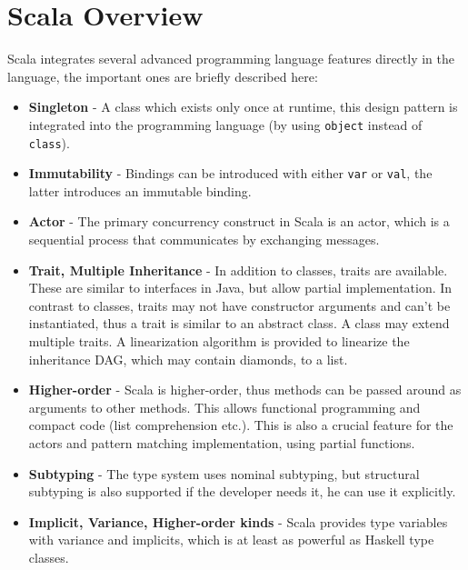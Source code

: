 \documentclass{article}
\begin{document}
\section{Scala Overview} \label{section:scala}
Scala integrates several advanced programming language features directly in the language, the important ones are briefly described here:
\begin{itemize}
\item \textbf{Singleton} - A class which exists only once at runtime, this design pattern is integrated into the programming language (by using \texttt{object} instead of \texttt{class}).
\item \textbf{Immutability} - Bindings can be introduced with either \texttt{var} or \texttt{val}, the latter introduces an immutable binding. 
\item \textbf{Actor} - The primary concurrency construct in Scala is an actor, which is a sequential process that communicates by exchanging messages.
\item \textbf{Trait, Multiple Inheritance} - In addition to classes, traits are available. These are similar to interfaces in Java, but allow partial implementation. In contrast to classes, traits may not have constructor arguments and can't be instantiated, thus a trait is similar to an abstract class. A class may extend multiple traits. A linearization algorithm is provided to linearize the inheritance DAG, which may contain diamonds, to a list.
\item \textbf{Higher-order} - Scala is higher-order, thus methods can be passed around as arguments to other methods. This allows functional programming and compact code (list comprehension etc.). This is also a crucial feature for the actors and pattern matching implementation, using partial functions.
\item \textbf{Subtyping} - The type system uses nominal subtyping, but structural subtyping is also supported if the developer needs it, he can use it explicitly.
\item \textbf{Implicit, Variance, Higher-order kinds} - Scala provides type variables with variance and implicits, which is at least as powerful as Haskell type classes.
\end{itemize}
\end{document}
